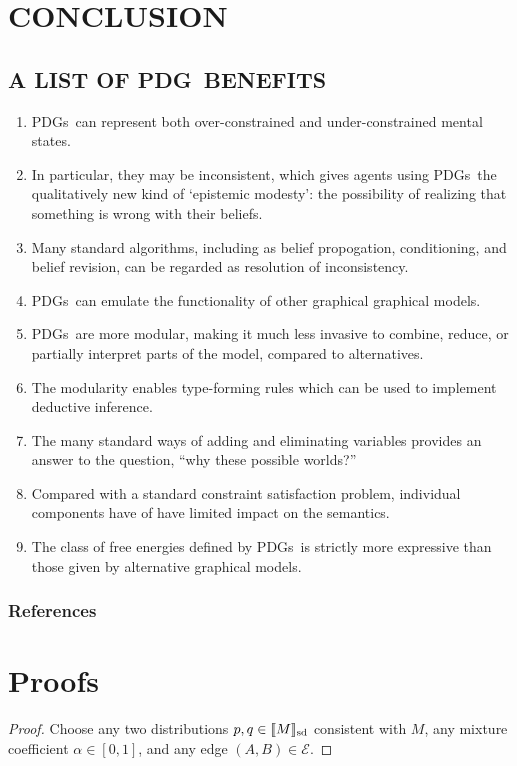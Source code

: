 \documentclass{article}
\newcommand\SD{_{\text{sd}}}
\newcommand{\Ed}{\mathcal E}
\newcommand{\MN}{PDG}
\newcommand{\MNs}{\MN s}
\numberwithin{equation}{section}
\begin{document}
\begin{notfocus}
	\section{CONCLUSION}
	\subsection{A LIST OF \MN\ BENEFITS}\label{sec:list-of-benefits}
	\begin{enumerate}[nosep]
		\item \MNs\ can represent both over-constrained and under-constrained mental states. 
		\item In particular, they may be inconsistent, which gives agents using \MNs\ the qualitatively new kind of `epistemic modesty': the possibility of realizing that something is wrong with their beliefs.
		\item Many standard algorithms, including as belief propogation, conditioning, and belief revision, can be regarded as resolution of inconsistency.
		\item \MNs\ can emulate the functionality of other graphical graphical models.
		\item \MNs\ are more modular, making it much less invasive to combine, reduce, or partially interpret parts of the model, compared to alternatives.
		\item The modularity enables type-forming rules which can be used to implement deductive inference.
		\item The many standard ways of adding and eliminating variables provides an answer to the question, ``why these possible worlds?''
		\item Compared with a standard constraint satisfaction problem, individual components have of have limited impact on the semantics.
		\item The class of free energies defined by \MNs\ is strictly more expressive than those given by alternative graphical models.
	\end{enumerate} %
	
	\subsubsection*{References}
	\printbibliography[heading=none]
	
	\onecolumn
	\appendix
	
	\section{Proofs}
	\thmsetconvex*
	\begin{proof}
		Choose any two distributions $p, q \in \bbr{M}\SD$ consistent with $M$, any mixture coefficient $\alpha \in [0,1]$, and any edge $(A,B) \in \Ed$.
		

\end{proof}
\end{notfocus}
\end{document}
